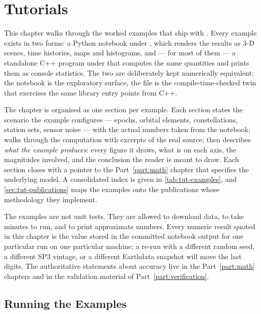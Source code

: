 \chapter{Tutorials}
\label{chap:tutorials}

This chapter walks through the worked examples that ship with \lupnt{}. Every
example exists in two forms: a Python notebook under ,
which renders the results as 3-D scenes, time histories, maps and histograms,
and --- for most of them --- a standalone C++ program under
 that computes the same quantities and prints them
as console statistics. The two are deliberately kept numerically equivalent: the
notebook is the exploratory surface, the  file is the
compile-time-checked twin that exercises the same library entry points from
C++.

The chapter is organised as one section per example. Each section states the
scenario the example configures --- epochs, orbital elements, constellations,
station sets, sensor noise --- with the actual numbers taken from the notebook;
walks through the computation with excerpts of the real source; then describes
\emph{what the example produces}: every figure it draws, what is on each axis,
the magnitudes involved, and the conclusion the reader is meant to draw. Each
section closes with a pointer to the Part~\ref{part:math} chapter that specifies
the underlying model. A consolidated index is given in
\cref{tab:tut-examples}, and \cref{sec:tut-publications} maps the examples onto
the publications whose methodology they implement.

\begin{lupntnote}
The examples are not unit tests. They are allowed to download data, to take
minutes to run, and to print approximate numbers. Every numeric result quoted in
this chapter is the value stored in the committed notebook output for one
particular run on one particular machine; a re-run with a different random seed,
a different SP3 vintage, or a different Earthdata snapshot will move the last
digits. The authoritative statements about accuracy live in the
Part~\ref{part:math} chapters and in the validation material of
Part~\ref{part:verification}.
\end{lupntnote}

\section{Running the Examples}
\label{sec:tut-running}

